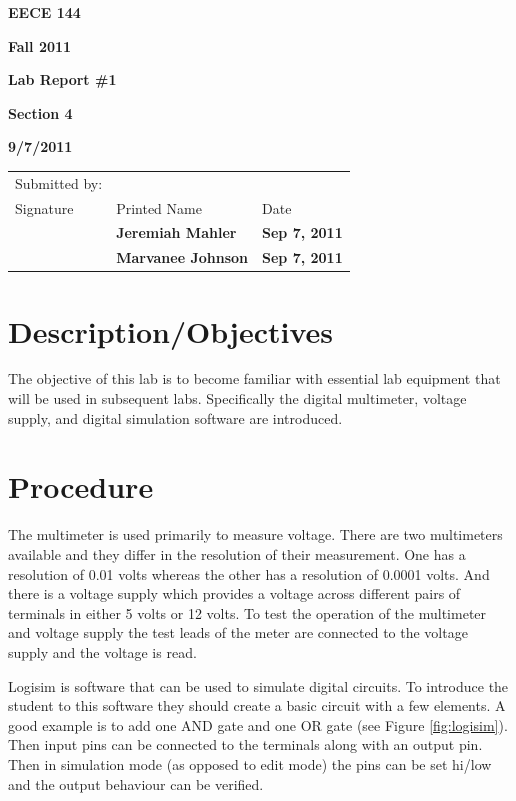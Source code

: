 \documentclass[12pt]{article}
\begin{document}

\centerline{\bf EECE 144}
\centerline{\bf Fall 2011}
\centerline{\bf}
\centerline{\bf Lab Report \#1}
\centerline{\bf Section 4}
\centerline{\bf 9/7/2011}

\begin{center}
\begin{tabularx}{\textwidth}[b]{X X l}
Submitted by: & & \\
Signature & Printed Name & Date \\
\hline
\multicolumn{1}{|X|}{} & \multicolumn{1}{|l|}{\bigstrut \bf Jeremiah Mahler} & \multicolumn{1}{|l|}{\bf Sep 7, 2011} \\
\hline
\multicolumn{1}{|X|}{} & \multicolumn{1}{|l|}{\bigstrut \bf Marvanee Johnson} & \multicolumn{1}{|l|}{\bf Sep 7, 2011} \\
\hline
\end{tabularx}
\end{center}

\section{Description/Objectives}

The objective of this lab is to become familiar with essential
lab equipment that will be used in subsequent labs.
Specifically the digital multimeter, voltage supply, and digital simulation
software are introduced.

\section{Procedure}

The multimeter is used primarily to measure voltage.
There are two multimeters available and they differ in
the resolution of their measurement.
One has a resolution of 0.01 volts whereas the other has a resolution
of 0.0001 volts.
And there is a voltage supply which provides a voltage across
different pairs of terminals in either 5 volts or 12 volts.
To test the operation of the multimeter and voltage supply the test
leads of the meter are connected to the voltage supply and the voltage
is read.

Logisim \cite{LOGISIM} is software that can be used to simulate digital
circuits.
To introduce the student to this software they should create a basic circuit
with a few elements.
A good example is to add one AND gate and one OR gate (see Figure \ref{fig:logisim}).
Then input pins can be connected to the terminals along with an output pin.
Then in simulation mode (as opposed to edit mode) the pins can be set hi/low
and the output behaviour can be verified.
\end{document}
